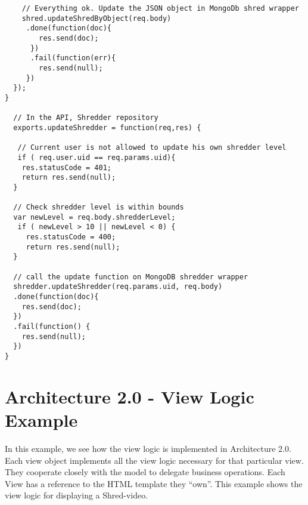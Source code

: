 \begin{lstlisting}
	// Everything ok. Update the JSON object in MongoDb shred wrapper
    shred.updateShredByObject(req.body)
     .done(function(doc){
        res.send(doc);
      })
      .fail(function(err){
        res.send(null);
     })
  });
}
  
  // In the API, Shredder repository
  exports.updateShredder = function(req,res) {

   // Current user is not allowed to update his own shredder level
   if ( req.user.uid == req.params.uid){
    res.statusCode = 401;
    return res.send(null);
  }
  
  // Check shredder level is within bounds
  var newLevel = req.body.shredderLevel;
   if ( newLevel > 10 || newLevel < 0) {
     res.statusCode = 400;
     return res.send(null);
  }

  // call the update function on MongoDB shredder wrapper
  shredder.updateShredder(req.params.uid, req.body)
  .done(function(doc){
    res.send(doc);
  })
  .fail(function() {
    res.send(null);
  })
}
\end{lstlisting}

\section{Architecture 2.0 - View Logic Example}
\label{sec:bview}
In this example, we see how the view logic is implemented in Architecture 2.0. Each view object implements all the view logic necessary for that particular view. They cooperate closely with the model to delegate business operations. Each View has a reference to the HTML template they ``own''. This example shows the view logic for displaying a Shred-video. 

